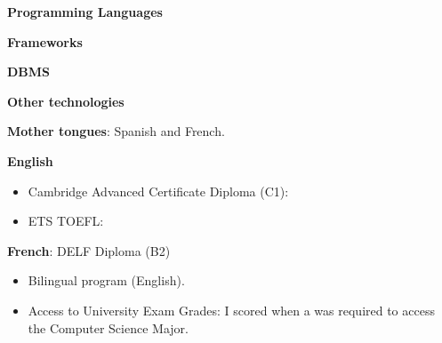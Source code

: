 
\textbf{Programming Languages}
\medskip


\divider

\textbf{Frameworks}
\medskip


\divider

\textbf{DBMS}
\medskip


\divider

\textbf{Other technologies}
\medskip


\divider

\textbf{Mother tongues}: Spanish and French.

\divider

\textbf{English}
\medskip
\begin{itemize}
\item Cambridge Advanced Certificate Diploma (C1): 
\item ETS TOEFL: 
\end{itemize}

\divider

\textbf{French}: DELF Diploma (B2)



\divider

\begin{itemize}
\item Bilingual program (English).
\item Access to University Exam Grades: I scored  when a  was required to access the Computer Science Major.
\end{itemize}

